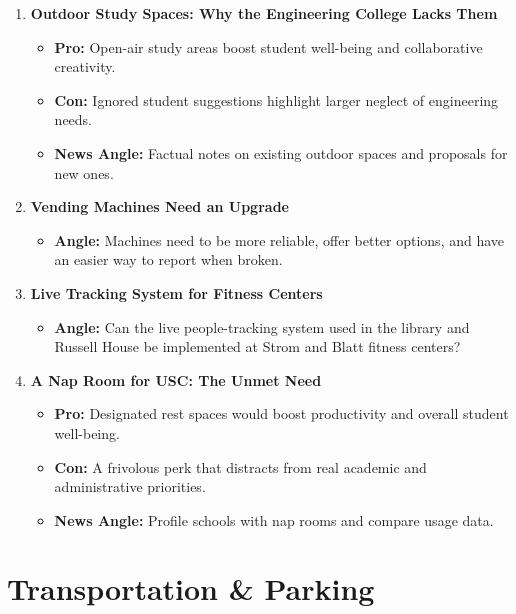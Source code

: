 \documentclass{article}
\begin{document}
\begin{enumerate}[leftmargin=*]
    \item \textbf{Outdoor Study Spaces: Why the Engineering College Lacks Them}
    \begin{itemize}
        \item \textbf{Pro:} Open-air study areas boost student well-being and collaborative creativity.
        \item \textbf{Con:} Ignored student suggestions highlight larger neglect of engineering needs.
        \item \textbf{News Angle:} Factual notes on existing outdoor spaces and proposals for new ones.
    \end{itemize}

    \item \textbf{Vending Machines Need an Upgrade}
    \begin{itemize}
        \item \textbf{Angle:} Machines need to be more reliable, offer better options, and have an easier way to report when broken.
    \end{itemize}

    \item \textbf{Live Tracking System for Fitness Centers}
    \begin{itemize}
        \item \textbf{Angle:} Can the live people-tracking system used in the library and Russell House be implemented at Strom and Blatt fitness centers?
    \end{itemize}

    \item \textbf{A Nap Room for USC: The Unmet Need}
    \begin{itemize}
        \item \textbf{Pro:} Designated rest spaces would boost productivity and overall student well-being.
        \item \textbf{Con:} A frivolous perk that distracts from real academic and administrative priorities.
        \item \textbf{News Angle:} Profile schools with nap rooms and compare usage data.
    \end{itemize}
\end{enumerate}

\section*{Transportation \& Parking}
\end{document}
